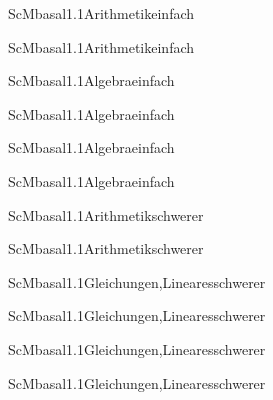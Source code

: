 \documentclass[12pt]{article}
\begin{document}
\begin{Add}{ScM}{basal1.1}{Arithmetik}{einfach}
\solution{ }
\end{Add}
\begin{Add}{ScM}{basal1.1}{Arithmetik}{einfach}
\end{Add}

\begin{Add}{ScM}{basal1.1}{Algebra}{einfach}
\solution{ }
\end{Add}
\begin{Add}{ScM}{basal1.1}{Algebra}{einfach}
\end{Add}

\begin{Add}{ScM}{basal1.1}{Algebra}{einfach}
\solution{ }
\end{Add}
\begin{Add}{ScM}{basal1.1}{Algebra}{einfach}
\end{Add}

\begin{Add}{ScM}{basal1.1}{Arithmetik}{schwerer}
\solution{ }
\end{Add}
\begin{Add}{ScM}{basal1.1}{Arithmetik}{schwerer}
\end{Add}

\begin{Add}{ScM}{basal1.1}{Gleichungen,Lineares}{schwerer}
\solution{ }
\end{Add}
\begin{Add}{ScM}{basal1.1}{Gleichungen,Lineares}{schwerer}
\end{Add}

\begin{Add}{ScM}{basal1.1}{Gleichungen,Lineares}{schwerer}
\solution{ }
\end{Add}
\begin{Add}{ScM}{basal1.1}{Gleichungen,Lineares}{schwerer}
\end{Add}
\end{document}
